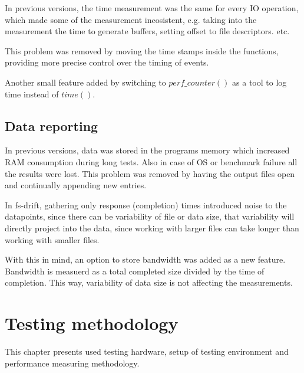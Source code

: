 \documentclass[
  color, %
  table, %
  lof,   %
  lot,   %
]{fithesis3}
\begin{document}
In previous versions, the time measurement was the same for every IO operation, which made some of the measurement incosistent, e.g. taking into the measurement the time to generate buffers, setting offset to file descriptors. etc.

This problem was removed by moving the time stamps inside the functions, providing more precise control over the timing of events.

Another small feature added by switching to $perf\_counter()$ as a tool to log time instead of $time()$.


\section{Data reporting}
In previous versions, data was stored in the programs memory which increased RAM consumption during long tests. Also in case of OS or benchmark failure all the results were lost. This problem was removed by having the output files open and continually appending new entries.

In fs-drift, gathering only response (completion) times introduced noise to the datapoints, since there can be variability of file or data size, that variability will directly project into the data, since working with larger files can take longer than working with smaller files.

With this in mind, an option to store bandwidth was added as a new feature. Bandwidth is measuerd as a total completed size divided by the time of completion. This way, variability of data size is not affecting the measurements.




\chapter{Testing methodology}
\label{methodology}
This chapter presents used testing hardware, setup of testing environment and performance measuring methodology.
\end{document}
